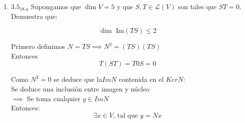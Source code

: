 \documentclass{article}
\begin{document}
		\begin{enumerate}
			
			\item[] \(3.5_{18.a}\) Supongamos que \(\dim V=5\) y que \(S,T \in \mathscr{L}(V)\) son tales que \(ST=0\). Demuestra que:
			
			\begin{equation*}
				\dim\text{ Im}(TS) \leq 2
			\end{equation*}
			
			Primero definimos \(N=TS \implies N^2=(TS)(TS)\) \\
			Entonces\\
			\begin{equation*}
				T(ST) = T0S = 0 
			\end{equation*}
			
			Como \(N^2=0\) se deduce que la\(Im N\) contenida en el \(Ker N\):\\
			Se deduce una inclusión entre imagen y núcleo \\
			\(\implies\) Se toma cualquier \(y\in Im N\) \\
			Entonces:
			\begin{equation*}
				\exists x \in V \text{, tal que } y =Nx
			\end{equation*}
			
			
		\end{enumerate}
		
	
\end{document}
